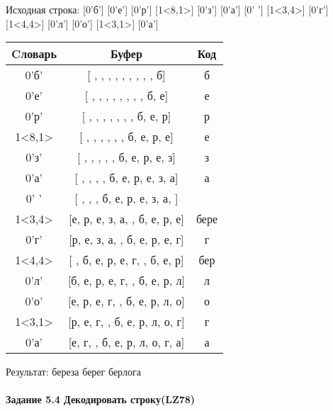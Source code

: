 \documentclass[a4paper, 12pt]{article}
\begin{document}
Исходная строка: [0'б'] [0'е'] [0'р'] [1<8,1>] [0'з'] [0'а'] [0' '] [1<3,4>] [0'г'] [1<4,4>] [0'л'] [0'о'] [1<3,1>] [0'а']\\
\begin{table}[h!]
\centering
\begin{tabular}{|c|c|c|}
\hline
 Cловарь & Буфер & Код  \\ \hline
0'б' & [ ,  ,  ,  ,  ,  ,  ,  ,  , б] & б
\\ \hline
0'е' & [ ,  ,  ,  ,  ,  ,  ,  , б, е] & е
\\ \hline
0'р' & [ ,  ,  ,  ,  ,  ,  , б, е, р] & р
\\ \hline
1<8,1> & [ ,  ,  ,  ,  ,  , б, е, р, е] & е
\\ \hline
0'з' & [ ,  ,  ,  ,  , б, е, р, е, з] & з
\\ \hline
0'а' & [ ,  ,  ,  , б, е, р, е, з, а] & а
\\ \hline
0' ' & [ ,  ,  , б, е, р, е, з, а,  ] &  
\\ \hline
1<3,4> & [е, р, е, з, а,  , б, е, р, е] & бере
\\ \hline
0'г' & [р, е, з, а,  , б, е, р, е, г] & г
\\ \hline
1<4,4> & [ , б, е, р, е, г,  , б, е, р] &  бер
\\ \hline
0'л' & [б, е, р, е, г,  , б, е, р, л] & л
\\ \hline
0'о' & [е, р, е, г,  , б, е, р, л, о] & о
\\ \hline
1<3,1> & [р, е, г,  , б, е, р, л, о, г] & г
\\ \hline
0'а' & [е, г,  , б, е, р, л, о, г, а] & а
\\ \hline
\end{tabular}
\end{table}

Результат: береза берег берлога
\pagebreak
\paragraph{Задание 5.4 Декодировать строку(LZ78)\\}
\end{document}
